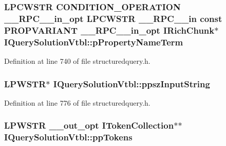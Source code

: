 \subsubsection[{\texorpdfstring{p\+Property\+Name\+Term}{pPropertyNameTerm}}]{ {\bf L\+P\+C\+W\+S\+TR} {\bf C\+O\+N\+D\+I\+T\+I\+O\+N\+\_\+\+O\+P\+E\+R\+A\+T\+I\+ON} {\bf \+\_\+\+\_\+\+R\+P\+C\+\_\+\+\_\+in\+\_\+opt} {\bf L\+P\+C\+W\+S\+TR} {\bf \+\_\+\+\_\+\+R\+P\+C\+\_\+\+\_\+in} {\bf const} {\bf P\+R\+O\+P\+V\+A\+R\+I\+A\+NT} {\bf \+\_\+\+\_\+\+R\+P\+C\+\_\+\+\_\+in\+\_\+opt} {\bf I\+Rich\+Chunk}$\ast$ I\+Query\+Solution\+Vtbl\+::p\+Property\+Name\+Term}\hypertarget{struct_i_query_solution_vtbl_aa0754b2674388a619fcc32162329c626}{}\label{struct_i_query_solution_vtbl_aa0754b2674388a619fcc32162329c626}


Definition at line 740 of file structuredquery.\+h.

\subsubsection[{\texorpdfstring{ppsz\+Input\+String}{ppszInputString}}]{ {\bf L\+P\+W\+S\+TR}$\ast$ I\+Query\+Solution\+Vtbl\+::ppsz\+Input\+String}\hypertarget{struct_i_query_solution_vtbl_ad3640dd7f2869cb4da5a5c86de9cb60e}{}\label{struct_i_query_solution_vtbl_ad3640dd7f2869cb4da5a5c86de9cb60e}


Definition at line 776 of file structuredquery.\+h.

\subsubsection[{\texorpdfstring{pp\+Tokens}{ppTokens}}]{ {\bf L\+P\+W\+S\+TR} {\bf \+\_\+\+\_\+out\+\_\+opt} {\bf I\+Token\+Collection}$\ast$$\ast$ I\+Query\+Solution\+Vtbl\+::pp\+Tokens}\hypertarget{struct_i_query_solution_vtbl_a2f12aeba14579ec5c0ffb1b4779c1858}{}\label{struct_i_query_solution_vtbl_a2f12aeba14579ec5c0ffb1b4779c1858}


